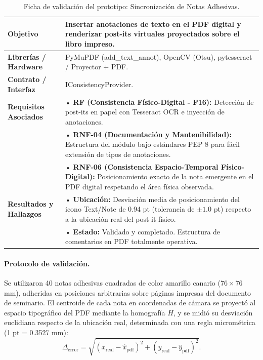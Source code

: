 \begin{table}[H]
    \centering
    \caption{Ficha de validación del prototipo: Sincronización de Notas Adhesivas.}
    \label{tab:ficha_f16}
    \begin{tabular}{|L{3.2cm}|L{11.0cm}|}
        \hline
        \textbf{Objetivo} & Insertar anotaciones de texto en el PDF digital y renderizar post-its virtuales proyectados sobre el libro impreso. \\ \hline
        \textbf{Librerías / Hardware} & PyMuPDF (add\_text\_annot), OpenCV (Otsu), pytesseract / Proyector + PDF. \\ \hline
        \textbf{Contrato / Interfaz} & IConsistencyProvider. \\ \hline
        \textbf{Requisitos Asociados} &
        • \textbf{RF (Consistencia Físico-Digital - F16):} Detección de post-its en papel con Tesseract OCR e inyección de anotaciones. \vspace{0.1cm} \\
        & • \textbf{RNF-04 (Documentación y Mantenibilidad):} Estructura del módulo bajo estándares PEP 8 para fácil extensión de tipos de anotaciones. \vspace{0.1cm} \\
        & • \textbf{RNF-06 (Consistencia Espacio-Temporal Físico-Digital):} Posicionamiento exacto de la nota emergente en el PDF digital respetando el área física observada. \\ \hline
        \textbf{Resultados y Hallazgos} &
        • \textbf{Ubicación:} Desviación media de posicionamiento del icono Text/Note de 0.94 pt (tolerancia de $\pm1.0$ pt) respecto a la ubicación real del post-it físico. \vspace{0.1cm} \\
        & • \textbf{Estado:} Validado y completado. Estructura de comentarios en PDF totalmente operativa. \\ \hline
    \end{tabular}
\end{table}
 
\paragraph{Protocolo de validación.} Se utilizaron 40 notas adhesivas cuadradas de color amarillo canario ($76 \times 76$ mm), adheridas en posiciones arbitrarias sobre páginas impresas del documento de seminario. El centroide de cada nota en coordenadas de cámara se proyectó al espacio tipográfico del PDF mediante la homografía $H$, y se midió su desviación euclidiana respecto de la ubicación real, determinada con una regla micrométrica (1 pt = 0.3527 mm):
\[ \Delta_{\mathrm{error}} = \sqrt{(x_{\mathrm{real}} - \hat{x}_{\mathrm{pdf}})^2 + (y_{\mathrm{real}} - \hat{y}_{\mathrm{pdf}})^2}. \]
 
